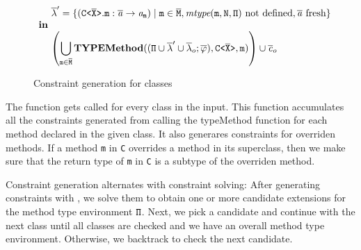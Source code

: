 \documentclass[a4paper,USenglish,cleveref, autoref, thm-restate]{lipics-v2021}
\begin{document}
\begin{figure}[tp]
\begin{gather*}
\begin{array}{@{}l@{}l}
\begin{array}{l@{}l@{}l}
                               &\ \ol{\methodAssumption}' = 
                                 \set{ (\exptype{C}{\ol{X}}.\mv{m} : \ol{\tv{a}} \to \tv{a}_{\mv
                                 m}) \mid \mv{m} \in \ol{M},
                                 \textit{mtype} (\mv m, \mv N,
                                 \mv\Pi) \text{ not defined}, \ol{\tv{a}}\ \text{fresh} } \\
                  \textbf{in} \\
                               &\ \displaystyle{ \left(
                                 \bigcup_{\texttt{m} \in \ol{M}}
                                 \typeMethod( (\mv{\Pi} \cup
                                 \ol{\methodAssumption}' \cup
                                 \ol{\methodAssumption}_o ;
                                 \ol{\fieldAssumption}), \exptype{C}{\ol{X}},  \mathtt{m}) \right)
                                 \cup \constraints_o } \\ 
                \end{array}
    \end{array}
  \end{gather*}
  \caption{Constraint generation for classes}
  \label{fig:constraints-for-classes}
\end{figure}


The \fjtype function gets called for every class in the input.
This function accumulates all the constraints generated from calling the
typeMethod function for each method declared in the given class.
It also generares constraints for overriden methods.
If a method \texttt{m} in \texttt{C} overrides a method in its superclass,
then we make sure that the return type of \texttt{m} in \texttt{C} is
a subtype of the overriden method.
\fi

Constraint generation alternates with constraint solving: After
generating constraints with {\fjtype}, we solve them to obtain one or
more candidate extensions for the method type environment
${\tt \Pi}$. Next, we pick a candidate and continue with the next class
until all classes are checked and we have an overall method type
environment.  Otherwise, we backtrack to check the next candidate. 
\end{document}
